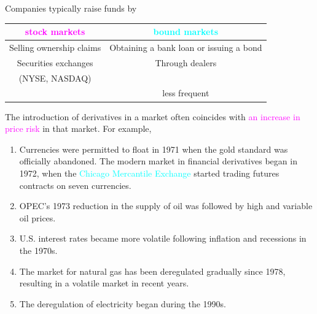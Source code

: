 \begin{frame}[fragile,t]

\begin{center}
	Companies typically raise funds by
	\bigskip
	\bigskip

	\renewcommand{\arraystretch}{1.2}
	\begin{tabular}{|c|c|}
		\hline
		\textcolor{magenta}{stock markets} & \textcolor{cyan}{bound markets}         \\
		\hline
		Selling ownership claims           & Obtaining a bank loan or issuing a bond \\
		Securities exchanges               & Through dealers                         \\
		(NYSE, NASDAQ)                     &                                         \\
                                       & less frequent                           \\
	  \hline
	\end{tabular}
\end{center}
\end{frame}
\begin{frame}[fragile,t]
	The introduction of derivatives in a market often coincides with \textcolor{magenta}{an increase
	in price risk} in that market. For example,
\begin{enumerate}
	\item Currencies were permitted to float in 1971 when the gold standard was officially abandoned.
		The modern market in financial derivatives began in 1972, when the \textcolor{cyan}{Chicago
		Mercantile Exchange} started trading futures contracts on seven currencies.
	\item OPEC’s 1973 reduction in the supply of oil was followed by high and variable oil prices.
	\item U.S. interest rates became more volatile following inflation and recessions in the 1970s.
	\item The market for natural gas has been deregulated gradually since 1978, resulting in a
		volatile market in recent years.
	\item The deregulation of electricity began during the 1990s.
\end{enumerate}
\end{frame}
